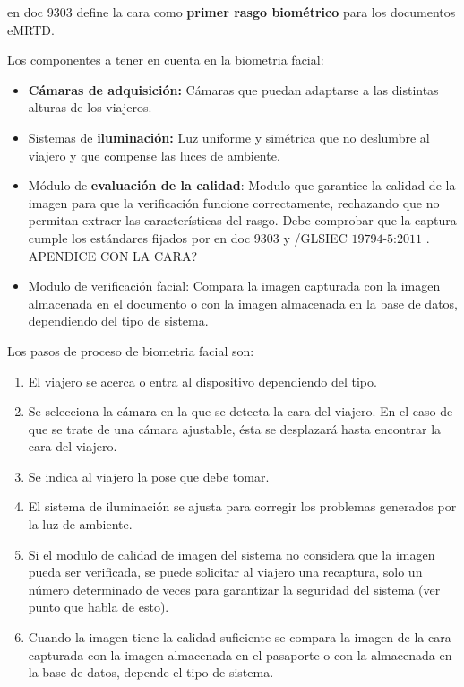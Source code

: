 \color{red}
 en doc $9303$ \cite{doc20069303} define la cara como \textbf{primer rasgo biométrico} para los documentos \gls{eMRTD}.


Los componentes a tener en cuenta en la \gls{biometria} \gls{facial}:

\begin{itemize}
    \item
    \textbf{Cámaras de adquisición:} Cámaras que puedan adaptarse a las distintas alturas de los viajeros.
    \item
    Sistemas de \textbf{iluminación:} Luz uniforme y simétrica que no deslumbre al viajero y que compense las luces de ambiente.
    \item
    Módulo de \textbf{evaluación de la calidad}: Modulo que garantice la calidad de la imagen para que la verificación funcione correctamente, rechazando que no permitan extraer las características del rasgo. Debe comprobar que la captura cumple los estándares fijados por en doc $9303$ \cite{doc20069303} y /GLS{IEC} $19794$-$5$:$2011$ \cite{ISO/Face}. APENDICE CON LA CARA?
    \item
    Modulo de verificación facial: Compara la imagen capturada con la imagen almacenada en el documento o con la imagen almacenada en la base de datos, dependiendo del tipo de sistema.
\end{itemize}

Los pasos de proceso de biometria facial son:

\begin{enumerate}
    \item 
    El viajero se acerca o entra al dispositivo dependiendo del tipo.
    \item
    Se selecciona la cámara en la que se detecta la cara del viajero. En el caso de que se trate de una cámara ajustable, ésta se desplazará hasta encontrar la cara del viajero.
    \item 
    Se indica al viajero la pose que debe tomar.
    \item
    El sistema de iluminación se ajusta para corregir los problemas generados por la luz de ambiente.
    \item
    Si el modulo de calidad de imagen del sistema no considera que la imagen pueda ser verificada, se puede solicitar al viajero una recaptura, solo un número determinado de veces para garantizar la seguridad del sistema (ver punto que habla de esto).
    \item
    Cuando la imagen tiene la calidad suficiente se compara la imagen de la cara capturada con la imagen almacenada en el pasaporte o con la almacenada en la base de datos, depende el tipo de sistema. 
\end{enumerate}


